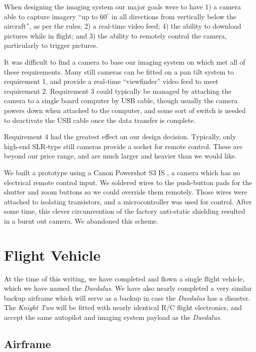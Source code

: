 \documentclass[pdftex,10pt,letter]{article}
\newcommand{\degrees}[1]
{
\begin{math}
#1^{\circ} 
\end{math}
}
\begin{document}
When designing the imaging system our major goals were to have 
1) a camera able to capture imagery ``up to \degrees{60} in all directions from vertically below the aircraft''\cite{competition_rules}, as per the rules; 
2) a real-time video feed;
4) the ability to download pictures while in flight; and
3) the ability to remotely control the camera, particularly to trigger pictures.

It was difficult to find a camera to base our imaging system on which met all of these requirements. Many still cameras can be fitted on a pan tilt system to requirement 1, and provide a real-time ``viewfinder'' video feed to meet requirement 2. Requirement 3 could typically be managed by attaching the camera to a single board computer by USB cable, though usually the camera powers down when attached to the computer, and some sort of switch is needed to deactivate the USB cable once the data transfer is complete.

Requirement 4 had the greatest effect on our design decision. Typically, only high-end SLR-type still cameras provide a socket for remote control. These are beyond our price range, and are much larger and heavier than we would like.

We built a prototype using a Canon Powershot S3 IS \cite{powershotS3}, a camera which has no electrical remote control input. We soldered wires to the push-button pads for the shutter and zoom buttons so we could override them remotely. Those wires were attached to isolating transistors, and a microcontroller was used for control. After some time, this clever circumvention of the factory anti-static shielding resulted in a burnt out camera. We abandoned this scheme.

\section{Flight Vehicle}

At the time of this writing, we have completed and flown a single flight vehicle, which we have named the \emph{Daedalus}.
We have also nearly completed a very similar backup airframe which will serve as a backup in case the \emph{Daedalus} has a disaster. The \emph{Knight Two} will be fitted with nearly identical R/C flight electronics, and accept the same autopilot and imaging system payload as the \emph{Daedalus}.

\newpage
\subsection{Airframe}
\end{document}
